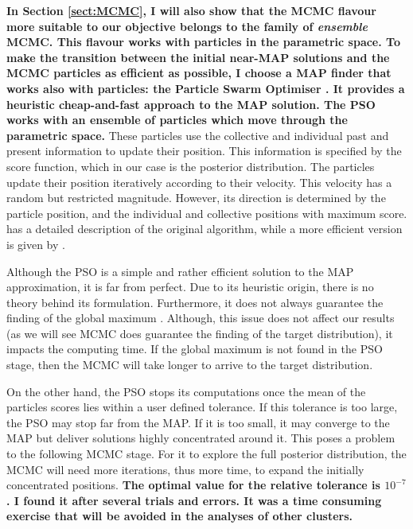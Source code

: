 \textbf{In Section \ref{sect:MCMC}, I will also show that the MCMC flavour more suitable to our objective belongs to the family of \emph{ensemble} MCMC. This flavour works with particles in the parametric space. To make the transition between the initial near-MAP solutions and the  MCMC particles as efficient as possible, I choose a MAP finder that works also with particles: the Particle Swarm Optimiser \cite[PSO,][]{Kennedy1995}. It provides a heuristic cheap-and-fast approach to the MAP solution. The PSO works with an ensemble of particles which move through the parametric space.} These particles use the collective and individual past and present information to update their position. This information is specified by the score function, which in our case is the posterior distribution. The particles update their position iteratively according to their velocity. This velocity has a random but restricted magnitude. However, its direction is determined by the particle position, and the individual and collective positions with maximum score. \citet{Kennedy1995} has a detailed description of the original algorithm, while a more efficient version is given by \citep{Clerc2002}.

Although the PSO is a simple and rather efficient solution to the MAP approximation, it is far from perfect. Due to its heuristic origin, there is no theory behind its formulation. Furthermore, it does not always guarantee the finding of the global maximum \cite[for a convergence guaranteed version see][]{Patel2013}. Although,  this issue does not affect our results (as we will see MCMC does guarantee the finding of the target distribution), it impacts the computing time. If the global maximum is not found in the PSO stage, then the MCMC will take longer to arrive to the target distribution. 

On the other hand, the PSO stops its computations once the mean of the particles scores lies within a user defined tolerance. If this tolerance is too large, the PSO may stop far from the MAP. If it is too small, it may converge to the MAP but deliver solutions highly concentrated around it. This poses a problem to the following MCMC stage. For it to explore the full posterior distribution, the MCMC will need more iterations, thus more time, to expand the initially concentrated positions. \textbf{The optimal value for the relative tolerance is $10^{-7}$. I found it after several trials and errors. It was a time consuming exercise that will be avoided in the analyses of other clusters.} 

